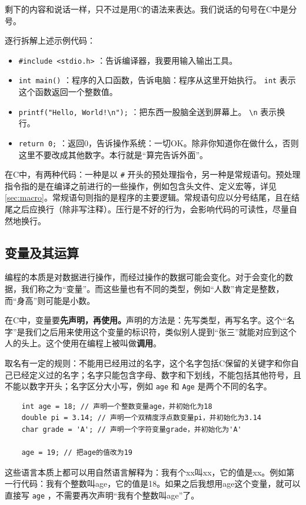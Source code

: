 剩下的内容和说话一样，只不过是用C的语法来表达。我们说话的句号在C中是分号。

逐行拆解上述示例代码：
\begin{itemize}
  \item  \texttt{\#include <stdio.h>} ：告诉编译器，我要用输入输出工具。
  \item  \texttt{int main()} ：程序的入口函数，告诉电脑：程序从这里开始执行。 \texttt{int} 表示这个函数返回一个整数值。
  \item  \texttt{printf("Hello, World!\textbackslash n");} ：把东西一股脑全送到屏幕上。 \texttt{\textbackslash n} 表示换行。
  \item  \texttt{return 0;} ：返回0，告诉操作系统：一切OK。除非你知道你在做什么，否则这里不要改成其他数字。本行就是“算完告诉外面”。
\end{itemize}

在C中，有两种代码：一种是以 \texttt{\#} 开头的预处理指令，另一种是常规语句。预处理指令指的是在编译之前进行的一些操作，例如包含头文件、定义宏等，详见\ref{sec:macro}。常规语句则指的是程序的主要逻辑。常规语句应以分号结尾，且在结尾之后应换行（除非写注释）。压行是不好的行为，会影响代码的可读性，尽量自然地换行。

\subsection{变量及其运算}

编程的本质是对数据进行操作，而经过操作的数据可能会变化。对于会变化的数据，我们称之为“变量”。而这些量也有不同的类型，例如“人数”肯定是整数，而“身高”则可能是小数。

在C中，变量要\textbf{先声明，再使用。}声明的方法是：先写类型，再写名字。这个“名字”是我们之后用来使用这个变量的标识符，类似别人提到“张三”就能对应到这个人的头上。这个使用在编程上被叫做\textbf{调用}。

取名有一定的规则：不能用已经用过的名字，这个名字包括C保留的关键字和你自己已经定义过的名字；名字只能包含字母、数字和下划线，不能包括其他符号，且不能以数字开头；名字区分大小写，例如 \texttt{age} 和 \texttt{Age} 是两个不同的名字。

\begin{verbatim}
    int age = 18; // 声明一个整数变量age，并初始化为18
    double pi = 3.14; // 声明一个双精度浮点数变量pi，并初始化为3.14
    char grade = 'A'; // 声明一个字符变量grade，并初始化为'A'

    age = 19; // 把age的值改为19
\end{verbatim}

这些语言本质上都可以用自然语言解释为：我有个xx叫xx，它的值是xx。例如第一行代码：我有个整数叫age，它的值是18。如果之后我想用age这个变量，就可以直接写 \texttt{age} ，不需要再次声明“我有个整数叫age”了。

